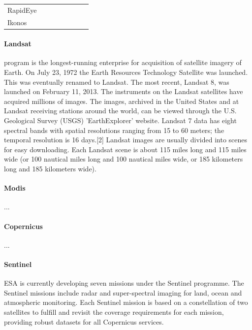 \begin{table}
\begin{tabular}{llllllll}
        RapidEye    &       &       &                                      &            &                                                               &            &                                                           \\
        Ikonos      &       &       &                                      &            &                                                               &            &                                                           \\
        \bottomrule
    \end{tabular}
\end{table}

\paragraph{Landsat} program is the longest-running enterprise for acquisition of satellite imagery of Earth.
On July 23, 1972 the Earth Resources Technology Satellite was launched. This was eventually renamed to Landsat. 
The most recent, Landsat 8, was launched on February 11, 2013. The instruments on the Landsat satellites have acquired millions of images.
The images, archived in the United States and at Landsat receiving stations around the world,
 can be viewed through the U.S. Geological Survey (USGS) 'EarthExplorer' website.
 Landsat 7 data has eight spectral bands with spatial resolutions ranging from 15 to 60 meters;
 the temporal resolution is 16 days.[2] Landsat images are usually divided into scenes for easy downloading.
 Each Landsat scene is about 115 miles long and 115 miles wide (or 100 nautical miles long and 100 nautical miles wide, or 185 kilometers long and 185 kilometers wide).

\paragraph{Modis} ...

\paragraph{Copernicus} ...

\paragraph{Sentinel} ESA is currently developing seven missions under the Sentinel programme.
The Sentinel missions include radar and super-spectral imaging for land, ocean and atmospheric monitoring.
Each Sentinel mission is based on a constellation of two satellites to fulfill and revisit the coverage requirements
for each mission, providing robust datasets for all Copernicus services.


